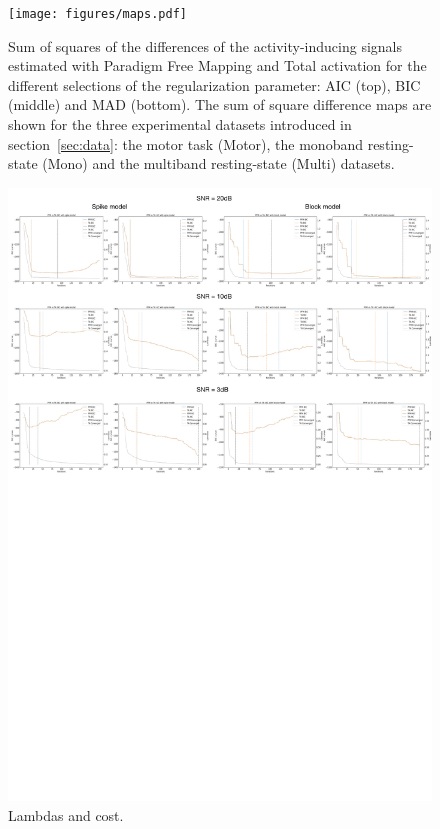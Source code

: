 \begin{figure}[t!]
    \begin{center}
        \texttt{[image: figures/maps.pdf]}
    \end{center}
    \caption{Sum of squares of the differences of the activity-inducing signals estimated with Paradigm Free Mapping and Total activation for the different selections of the regularization parameter: AIC (top), BIC (middle) and MAD (bottom). The sum of square difference maps are shown for the three experimental datasets introduced in section~\ref{sec:data}: the motor task (Motor), the monoband resting-state (Mono) and the multiband resting-state (Multi) datasets.}
\label{fig:rss}
\end{figure}

\begin{figure}[t!]
    \begin{center}
        \includegraphics[width=\textwidth]{figures/lambda_cost.pdf}
    \end{center}
    \caption{Lambdas and cost.}
\label{fig:lambdas}
\end{figure}

